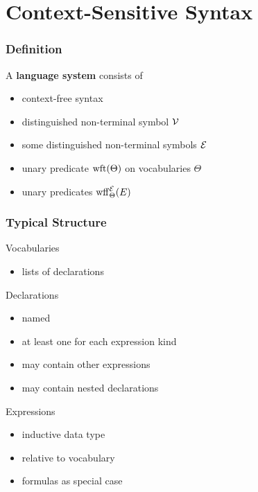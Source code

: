 \documentclass{beamer}
\begin{document}
\section{Context-Sensitive Syntax}

\begin{frame}\frametitle{Definition}
A \textbf{language system} consists of
\begin{itemize}
 \item context-free syntax
 \item distinguished non-terminal symbol $\mathcal{V}$ 
 \item some distinguished non-terminal symbols $\mathcal{E}$ 
 \item unary predicate $\mathrm{wft}(\Theta)$ on vocabularies $\Theta$ 
 \item unary predicates $\mathrm{wff}_{\Theta}^{\mathcal{E}}(E)$ 
\end{itemize}
\end{frame}

\begin{frame}\frametitle{Typical Structure}
Vocabularies
\begin{itemize}
\item lists of declarations
\end{itemize}

Declarations
\begin{itemize}
\item named
\item at least one for each expression kind
\item may contain other expressions 
\item may contain nested declarations 
\end{itemize}

Expressions
\begin{itemize}
\item inductive data type
\item relative to vocabulary 
\item formulas as special case
\end{itemize}
\end{frame}
\end{document}
